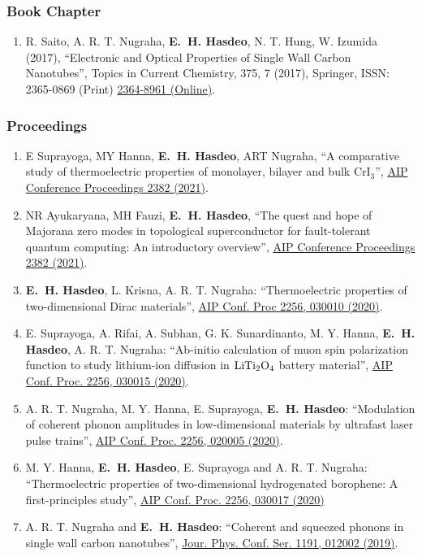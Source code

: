 \documentclass[a4paper,11pt]{article}
\def\hes{{\bf E.~H. Hasdeo}}
\begin{document}
\subsubsection*{Book Chapter}
\begin{enumerate}
\item R. Saito, A. R. T. Nugraha, \hes, N. T. Hung, W. Izumida (2017), ``Electronic and Optical Properties of Single Wall Carbon Nanotubes'', Topics in Current Chemistry, 375, 7 (2017), Springer, ISSN: 2365-0869 (Print) \href{http://dx.doi.org/10.1007/s41061-016-0095-2}{2364-8961 (Online)}.
\end{enumerate}

\vspace*{\baselineskip}

\subsubsection*{Proceedings}
\begin{enumerate}
 \item E Suprayoga, MY Hanna, \hes, ART Nugraha,
   ``A comparative study of thermoelectric properties of monolayer, bilayer and bulk CrI$_3$'', \href{https://doi.org/10.1063/5.0059994}{AIP Conference Proceedings 2382 (2021)}.
\item NR Ayukaryana, MH Fauzi, \hes, ``The quest and hope of Majorana zero modes in topological superconductor for fault-tolerant quantum computing: An introductory overview'', \href{https://doi.org/10.1063/5.0059974}{AIP Conference Proceedings 2382 (2021)}.
 \item \hes, L. Krisna, A. R. T. Nugraha:
  ``Thermoelectric properties of two-dimensional Dirac materials'',
   \href{https://doi.org/10.1063/5.0014592} {AIP Conf. Proc 2256, 030010 (2020)}.
\item E. Suprayoga, A. Rifai, A. Subhan, G. K. Sunardinanto, M. Y. Hanna, \hes,  A. R. T. Nugraha: ``Ab-initio calculation of muon spin polarization function to study lithium-ion diffusion in $\rm LiTi_2O_4$ battery material'', \href{https://doi.org/10.1063/5.0014693}{AIP Conf. Proc. 2256, 030015 (2020)}. 
\item A. R. T. Nugraha, M. Y. Hanna, E. Suprayoga, \hes: ``Modulation of coherent phonon amplitudes in low-dimensional materials by ultrafast laser pulse trains'', \href{https://doi.org/10.1063/5.0023505}{AIP Conf. Proc. 2256, 020005 (2020)}.
\item M. Y. Hanna, \hes, E. Suprayoga and A. R. T. Nugraha: ``Thermoelectric properties of two-dimensional hydrogenated borophene: A first-principles study'', \href{https://doi.org/10.1063/5.0014610}{AIP Conf. Proc. 2256, 030017 (2020)}
\item A. R. T. Nugraha and \hes: ``Coherent and squeezed phonons in single wall carbon nanotubes'', \href{https://doi.org/10.1088%2F1742-6596%2F1191%2F1%2F012002}
{Jour. Phys. Conf. Ser. 1191, 012002 (2019)}.
\end{enumerate}
\vspace*{\baselineskip}
\end{document}
